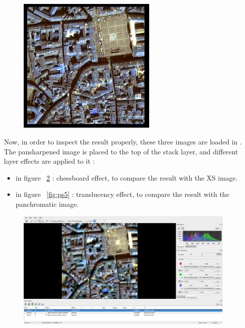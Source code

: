 \begin{figure}[!h] 
  \center
  \includegraphics[width=0.6\textwidth]{../Art/MonteverdiImages/ps3.png}
  \label{fig:ps3}
\end{figure}

Now, in order to inspect the result properly, these three images are loaded in \mont.
The pansharpened image is placed to the top of the stack layer, and different layer effects are applied to it :
\begin{itemize}
\item in figure ~\ref{fig:ps4} : chessboard effect, to compare the result with the XS image.
\item in figure ~\ref{fig:ps5} : translucency effect, to compare the result with the panchromatic image.
\end{itemize}

\begin{figure}[!h] 
  \center
  \includegraphics[width=0.95\textwidth]{../Art/MonteverdiImages/ps4.png}
  \label{fig:ps4}
\end{figure}

